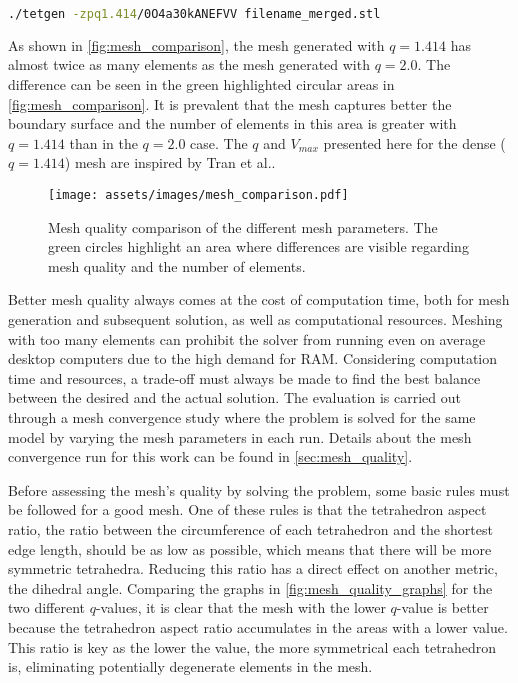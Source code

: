 \begin{lstlisting}[language=bash,caption={Command to run TetGen},captionpos=b, label=lst:tetgen_commands]
	./tetgen -zpq1.414/0O4a30kANEFVV filename_merged.stl
\end{lstlisting}

As shown in \autoref{fig:mesh_comparison}, the mesh generated with $q = 1.414$ has almost twice as many elements as the mesh generated with $q = 2.0$. The difference can be seen in the green highlighted circular areas in \autoref{fig:mesh_comparison}. It is prevalent that the mesh captures better the boundary surface and the number of elements in this area is greater with $q = 1.414$ than in the $q = 2.0$ case. The $q$ and $V_{max}$ presented here for the dense ($q=1.414$) mesh are inspired by Tran et al.\cite{Tran2020}.

\begin{figure}[H]
    \centering
    \texttt{[image: assets/images/mesh\_comparison.pdf]}
    \caption[Mesh quality comparison for the different $q$ parameters.]{Mesh quality comparison of the different mesh parameters. The green circles highlight an area where differences are visible regarding mesh quality and the number of elements.}
    \label{fig:mesh_comparison}
\end{figure}

Better mesh quality always comes at the cost of computation time, both for mesh generation and subsequent solution, as well as computational resources. Meshing with too many elements can prohibit the solver from running even on average desktop computers due to the high demand for \gls{RAM}. Considering computation time and resources, a trade-off must always be made to find the best balance between the desired and the actual solution. The evaluation is carried out through a mesh convergence study where the problem is solved for the same model by varying the mesh parameters in each run. Details about the mesh convergence run for this work can be found in \ref{sec:mesh_quality}.

Before assessing the mesh's quality by solving the problem, some basic rules must be followed for a good mesh. One of these rules is that the \gls{tetrahedron aspect ratio}, the ratio between the circumference of each tetrahedron and the shortest edge length, should be as low as possible, which means that there will be more symmetric tetrahedra. Reducing this ratio has a direct effect on another metric, the dihedral angle. Comparing the graphs in \autoref{fig:mesh_quality_graphs} for the two different $q$-values, it is clear that the mesh with the lower $q$-value is better because the \gls{tetrahedron aspect ratio} accumulates in the areas with a lower value. This ratio is key as the lower the value, the more symmetrical each tetrahedron is, eliminating potentially degenerate elements in the mesh.

